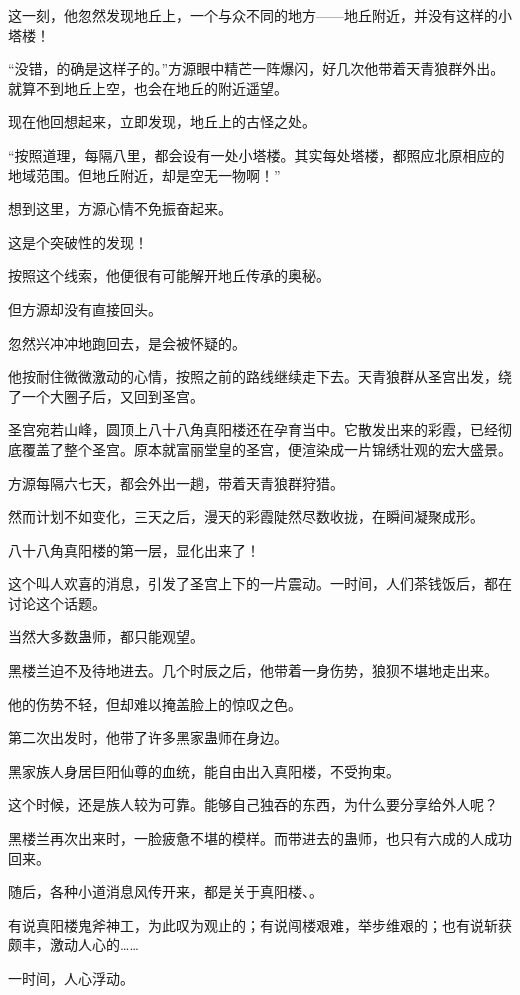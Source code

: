 \begin{this_body}
这一刻，他忽然发现地丘上，一个与众不同的地方——地丘附近，并没有这样的小塔楼！

“没错，的确是这样子的。”方源眼中精芒一阵爆闪，好几次他带着天青狼群外出。就算不到地丘上空，也会在地丘的附近遥望。

现在他回想起来，立即发现，地丘上的古怪之处。

“按照道理，每隔八里，都会设有一处小塔楼。其实每处塔楼，都照应北原相应的地域范围。但地丘附近，却是空无一物啊！”

想到这里，方源心情不免振奋起来。

这是个突破性的发现！

按照这个线索，他便很有可能解开地丘传承的奥秘。

但方源却没有直接回头。

忽然兴冲冲地跑回去，是会被怀疑的。

他按耐住微微激动的心情，按照之前的路线继续走下去。天青狼群从圣宫出发，绕了一个大圈子后，又回到圣宫。

圣宫宛若山峰，圆顶上八十八角真阳楼还在孕育当中。它散发出来的彩霞，已经彻底覆盖了整个圣宫。原本就富丽堂皇的圣宫，便渲染成一片锦绣壮观的宏大盛景。

方源每隔六七天，都会外出一趟，带着天青狼群狩猎。

然而计划不如变化，三天之后，漫天的彩霞陡然尽数收拢，在瞬间凝聚成形。

八十八角真阳楼的第一层，显化出来了！

这个叫人欢喜的消息，引发了圣宫上下的一片震动。一时间，人们茶钱饭后，都在讨论这个话题。

当然大多数蛊师，都只能观望。

黑楼兰迫不及待地进去。几个时辰之后，他带着一身伤势，狼狈不堪地走出来。

他的伤势不轻，但却难以掩盖脸上的惊叹之色。

第二次出发时，他带了许多黑家蛊师在身边。

黑家族人身居巨阳仙尊的血统，能自由出入真阳楼，不受拘束。

这个时候，还是族人较为可靠。能够自己独吞的东西，为什么要分享给外人呢？

黑楼兰再次出来时，一脸疲惫不堪的模样。而带进去的蛊师，也只有六成的人成功回来。

随后，各种小道消息风传开来，都是关于真阳楼、。

有说真阳楼鬼斧神工，为此叹为观止的；有说闯楼艰难，举步维艰的；也有说斩获颇丰，激动人心的……

一时间，人心浮动。

\end{this_body}

